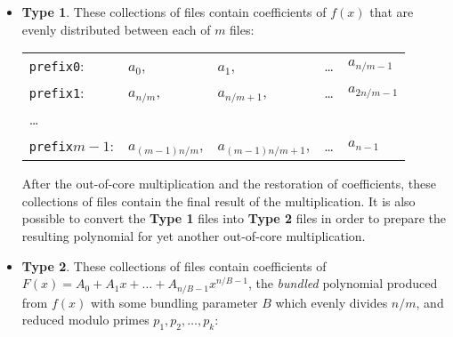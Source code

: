 \documentclass[a4paper,10pt]{article}
\begin{document}
\begin{itemize}
\item \textbf{Type 1}. These collections of files contain coefficients of $f(x)$ that are evenly distributed between each of $m$ files:

\begin{tabular}{l l l l l}
\texttt{prefix0}:  & $a_0$, & $a_1$, & \ldots & $a_{n/m - 1}$\\
\texttt{prefix1}: & $a_{n/m}$, & $a_{n/m + 1}$, & \ldots & $a_{2n/m - 1}$\\
\ldots \\
\texttt{prefix}$m-1$: & $a_{(m-1)n/m}$, & $a_{(m-1)n/m + 1}$, & \ldots & $a_{n - 1}$
\end{tabular}

After the out-of-core multiplication and the restoration of coefficients, these collections of files contain the final result of the multiplication. It is also possible to convert the \textbf{Type 1} files into \textbf{Type 2} files in order to prepare the resulting polynomial for yet another out-of-core multiplication.

\item \textbf{Type 2}. These collections of files contain coefficients of $F(x) = A_0 + A_1x + \ldots +A_{n/B - 1}x^{n/B - 1}$, the \emph{bundled} polynomial produced from $f(x)$ with some bundling parameter $B$ which evenly divides $n/m$, and reduced modulo primes $p_1, p_2, \ldots, p_k$:


\end{itemize}
\end{document}
